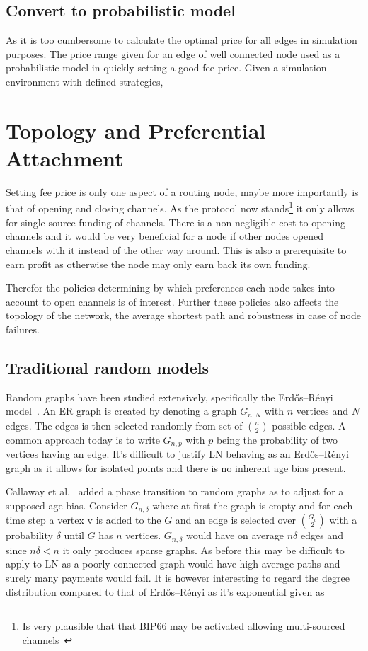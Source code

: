 \subsection{Convert to probabilistic model}

As it is too cumbersome to calculate the optimal price for all edges in simulation purposes. The price range given for an edge of well connected node used as a probabilistic model in quickly setting a good fee price. Given a simulation environment with defined strategies,  


\section{Topology and Preferential Attachment}

Setting fee price is only one aspect of a routing node, maybe more importantly is that of opening and closing channels.
As the protocol now stands\footnote{Is very plausible that that BIP66 may be activated allowing multi-sourced channels~\cite{bip:0118:sighash:noinput}} it only allows for single source funding of channels. There is a non negligible cost to opening channels and it would be very beneficial for a node if other nodes opened channels with it instead of the other way around. This is also a prerequisite to earn profit as otherwise the node may only earn back its own funding. 

Therefor the policies determining by which preferences each node takes into account to open channels is of interest. Further these policies also affects the topology of the network, the average shortest path and robustness in case of node failures.

\subsection{Traditional random models}

Random graphs have been studied extensively, specifically the Erdős–Rényi model~\cite{erdos:renyi:random:graphs}. An ER graph is created by denoting a graph $G_{n,N}$ with $n$ vertices and $N$ edges. The edges is then selected randomly from set of ${n \choose 2}$ possible edges. A common approach today is to write $G_{n,p}$ with $p$ being the probability of two vertices having an edge. It's difficult to justify LN behaving as an Erdős–Rényi graph as it allows for isolated points and there is no inherent age bias present. 

Callaway et al.~\cite{callaway:hopcraft:randomly:grown:graphs} added a phase transition to random graphs as to adjust for a supposed age bias. Consider $G_{n,\delta}$ where at first the graph is empty and for each time step a vertex v is added to the $G$ and an edge is selected over $G_v \choose 2$ with a probability $\delta$ until $G$ has $n$ vertices. $G_{n,\delta}$ would have on average $n\delta$ edges and since $n\delta < n$ it only produces sparse graphs. As before this may be difficult to apply to LN as a poorly connected graph would have high average paths and surely many payments would fail. It is however interesting to regard the \gls{degree distribution} compared to that of Erdős–Rényi as it's exponential given as

